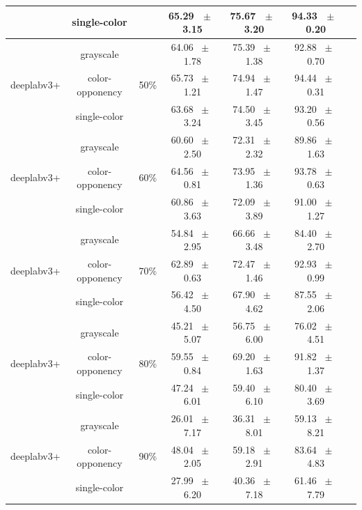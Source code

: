 \begin{table}[h]
\begin{tabular}{@{}lccc ccc@{}}
    & single-color &  & 65.29 ~$\pm$~ 3.15 & 75.67 ~$\pm$~ 3.20 & 94.33 ~$\pm$~ 0.20 \\
    \midrule
    \multirow{3}{*}{deeplabv3+} & grayscale & \multirow{3}{*}{50\%} & 64.06 ~$\pm$~ 1.78 & 75.39 ~$\pm$~ 1.38 & 92.88 ~$\pm$~ 0.70 \\
    & color-opponency &  & 65.73 ~$\pm$~ 1.21 & 74.94 ~$\pm$~ 1.47 & 94.44 ~$\pm$~ 0.31 \\
    & single-color &  & 63.68 ~$\pm$~ 3.24 & 74.50 ~$\pm$~ 3.45 & 93.20 ~$\pm$~ 0.56 \\
    \midrule
    \multirow{3}{*}{deeplabv3+} & grayscale & \multirow{3}{*}{60\%} & 60.60 ~$\pm$~ 2.50 & 72.31 ~$\pm$~ 2.32 & 89.86 ~$\pm$~ 1.63 \\
    & color-opponency &  & 64.56 ~$\pm$~ 0.81 & 73.95 ~$\pm$~ 1.36 & 93.78 ~$\pm$~ 0.63 \\
    & single-color &  & 60.86 ~$\pm$~ 3.63 & 72.09 ~$\pm$~ 3.89 & 91.00 ~$\pm$~ 1.27 \\
    \midrule
    \multirow{3}{*}{deeplabv3+} & grayscale & \multirow{3}{*}{70\%} & 54.84 ~$\pm$~ 2.95 & 66.66 ~$\pm$~ 3.48 & 84.40 ~$\pm$~ 2.70 \\
    & color-opponency &  & 62.89 ~$\pm$~ 0.63 & 72.47 ~$\pm$~ 1.46 & 92.93 ~$\pm$~ 0.99 \\
    & single-color &  & 56.42 ~$\pm$~ 4.50 & 67.90 ~$\pm$~ 4.62 & 87.55 ~$\pm$~ 2.06 \\
    \midrule
    \multirow{3}{*}{deeplabv3+} & grayscale & \multirow{3}{*}{80\%} & 45.21 ~$\pm$~ 5.07 & 56.75 ~$\pm$~ 6.00 & 76.02 ~$\pm$~ 4.51 \\
    & color-opponency &  & 59.55 ~$\pm$~ 0.84 & 69.20 ~$\pm$~ 1.63 & 91.82 ~$\pm$~ 1.37 \\
    & single-color &  & 47.24 ~$\pm$~ 6.01 & 59.40 ~$\pm$~ 6.10 & 80.40 ~$\pm$~ 3.69 \\
    \midrule
    \multirow{3}{*}{deeplabv3+} & grayscale & \multirow{3}{*}{90\%} & 26.01 ~$\pm$~ 7.17 & 36.31 ~$\pm$~ 8.01 & 59.13 ~$\pm$~ 8.21 \\
    & color-opponency &  & 48.04 ~$\pm$~ 2.05 & 59.18 ~$\pm$~ 2.91 & 83.64 ~$\pm$~ 4.83 \\
    & single-color &  & 27.99 ~$\pm$~ 6.20 & 40.36 ~$\pm$~ 7.18 & 61.46 ~$\pm$~ 7.79 \\
    \midrule
    \bottomrule
  \end{tabular}
  \label{tab:sparse_results_deeplabv3+_cityscapes}
\end{table}
